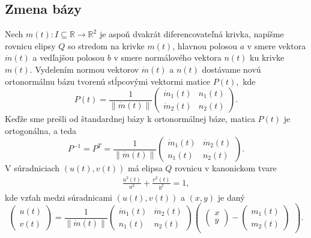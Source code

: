 \subsection{Zmena bázy}
Nech $m(t) \colon  I \subseteq \mathbb{R} \rightarrow \mathbb{R}^2$ je aspoň dvakrát diferencovateľná krivka, napíšme rovnicu elipsy $Q$ so stredom na krivke $m(t)$, hlavnou polosou $a$ v smere vektora $\dot{m}(t)$ a vedľajšou polosou $b$ v smere normálového vektora $n(t)$ ku krivke $m(t)$. Vydelením normou vektorov $\dot{m}(t)$ a $n(t)$ dostávame novú ortonormálnu bázu tvorenú stĺpcovými vektormi matice $P(t),$ kde
$$
P(t) = \frac{1}{ \| \dot{m}(t) \|} \left(\begin{matrix}
   \dot{m}_1(t) & n_1(t) \\
   \dot{m}_2(t) & n_2(t)
\end{matrix} \right).
$$
Keďže sme prešli od štandardnej bázy k ortonormálnej báze, matica $P(t)$ je ortogonálna, a teda
$$
P^{-1} = P^{T} = \frac{1}{ \| \dot{m}(t) \|} \left(\begin{matrix}
  \dot{m}_1(t) & \dot{m}_2(t) \\
    n_1(t) & n_2(t)
\end{matrix}\right).
$$
V súradniciach $(u(t), v(t))$ má elipsa $Q$ rovnicu v kanonickom tvare 
\begin{align*}
\frac{u^2(t)}{a^2} + \frac{v^2(t)}{b^2} = 1,
\end{align*}
kde vzťah medzi súradnicami $(u(t), v(t))$ a $(x,y)$ je daný
$$
\left(\begin{matrix}
u(t) \\
v(t)
\end{matrix}\right) = \frac{1}{ \| \dot{m}(t) \|}
\left(\begin{matrix}
  \dot{m}_1(t) & \dot{m}_2(t) \\
    n_1(t) & n_2(t)
\end{matrix}\right)
\left(\begin{matrix} \left(\begin{matrix} x \\ y \end{matrix}\right) - \left(\begin{matrix} m_1(t) \\ m_2(t) \end{matrix}\right) \end{matrix}\right).
$$
